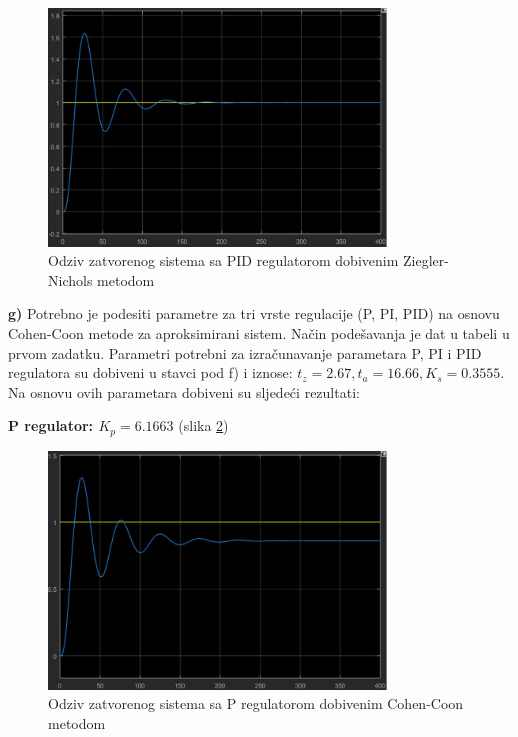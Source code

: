 \begin{figure} [H]
  \centering
  \includegraphics[width=0.8\textwidth]{z2_21}
  \caption{Odziv zatvorenog sistema sa PID regulatorom dobivenim Ziegler-Nichols metodom}
  \label{fig:z2_21}
\end{figure}
 
\textbf{g)} Potrebno je podesiti parametre za tri vrste regulacije (P, PI, PID) na osnovu Cohen-Coon metode za aproksimirani sistem. Način podešavanja je dat u tabeli u prvom zadatku.  Parametri potrebni za izračunavanje parametara P, PI i PID regulatora su dobiveni u stavci pod f) i iznose: $t_z=2.67, t_a=16.66, K_s=0.3555$. Na osnovu ovih parametara dobiveni su sljedeći rezultati:

\textbf{P regulator: $K_p=6.1663$} (slika \ref{fig:z2_22})

\begin{figure} [H]
  \centering
  \includegraphics[width=0.8\textwidth]{z2_22}
  \caption{Odziv zatvorenog sistema sa P regulatorom dobivenim Cohen-Coon metodom}
  \label{fig:z2_22}
\end{figure}


